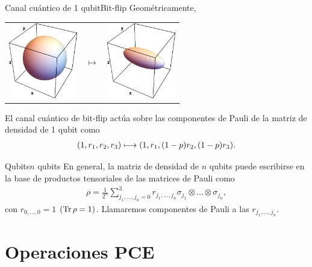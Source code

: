 \documentclass[xcolor=dvipsnames,presentation]{beamer}%
\begin{document}
\begin{frame}{Canal cuántico de 1 qubit}{Bit-flip}	
	Geométricamente,
	\begin{center}
	\begin{tabular}{m{2.5cm} m{1cm} m{2.5cm}}
		\includegraphics[width=3cm]{images/bloch-ball}
		& \hfill $\longmapsto$
		& \includegraphics[width=3cm]{images/bit-flip}
	\end{tabular}
	\end{center}\pause
	
	El canal cuántico de bit-flip 	actúa sobre las componentes de Pauli
	de la matriz de densidad de 1 qubit como
	\begin{align*}
	\qty(1,r_1,r_2,r_3) \longmapsto \qty(1,r_1,\qty(1-p)r_2,\qty(1-p)r_3).
	\end{align*}
\end{frame}

\begin{frame}{Qubits}{$n$ qubits}
	En general, la matriz de densidad de $n$ qubits puede escribirse 
	en la base de productos tensoriales de las matrices de Pauli como
	\begin{align*}
		\rho = \frac{1}{2^n}\sum _{j_1,\ldots,j_n=0}^3 r_{j_1,\ldots,j_n}
		\sigma_{j_1}\otimes \ldots
		\otimes\sigma_{j_n},
	\end{align*}
	con $r_{0,\ldots,0}=1$ $(\Tr\rho=1)$. \pause
	Llamaremos \alert{componentes de Pauli} a las $r_{j_1,\ldots,j_n}$.
\end{frame}

\section{Operaciones PCE}
\label{sec:Theory}
\end{document}
